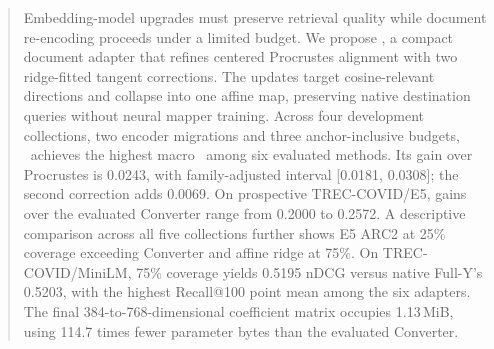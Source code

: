 \begin{abstract}
Embedding-model upgrades must preserve retrieval quality while document re-encoding proceeds under a limited budget. We propose \method, a compact document adapter that refines centered Procrustes alignment with two ridge-fitted tangent corrections. The updates target cosine-relevant directions and collapse into one affine map, preserving native destination queries without neural mapper training. Across four development collections, two encoder migrations and three anchor-inclusive budgets, \method\ achieves the highest macro \ndcg\ among six evaluated methods. Its gain over Procrustes is 0.0243, with family-adjusted interval [0.0181, 0.0308]; the second correction adds 0.0069. On prospective TREC-COVID/E5, gains over the evaluated Converter range from 0.2000 to 0.2572. A descriptive comparison across all five collections further shows E5 ARC2 at 25\% coverage exceeding Converter and affine ridge at 75\%. On TREC-COVID/MiniLM, 75\% coverage yields 0.5195 nDCG versus native Full-Y's 0.5203, with the highest Recall@100 point mean among the six adapters. The final 384-to-768-dimensional coefficient matrix occupies 1.13\,MiB, using 114.7 times fewer parameter bytes than the evaluated Converter.
\end{abstract}
